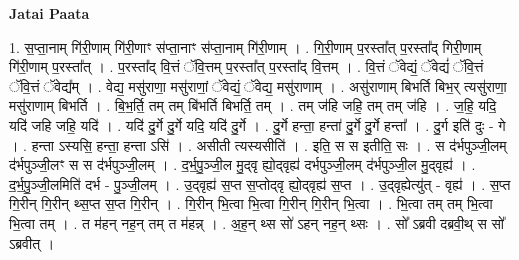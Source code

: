 \documentclass[17pt]{extarticle}
\begin{document}
\textbf{Jatai Paata} \newline

1. स॒प्ता॒नाम् गि॑री॒णाम् गि॑री॒णाꣳ स॑प्ता॒नाꣳ स॑प्ता॒नाम् गि॑री॒णाम् । . गि॒री॒णाम् प॒रस्ता᳚त् प॒रस्ता᳚द् गिरी॒णाम् गि॑री॒णाम् प॒रस्ता᳚त् । . प॒रस्ता᳚द् वि॒त्तं ॅवि॒त्तम् प॒रस्ता᳚त् प॒रस्ता᳚द् वि॒त्तम् । . वि॒त्तं ॅवेद्यं॒ ॅवेद्यं॑ ॅवि॒त्तं ॅवि॒त्तं ॅवेद्य᳚म् । . वेद्य॒ मसु॑राणा॒ मसु॑राणां॒ ॅवेद्यं॒ ॅवेद्य॒ मसु॑राणाम् । . असु॑राणाम् बिभर्ति बिभ॒र् त्यसु॑राणा॒ मसु॑राणाम् बिभर्ति । . बि॒भ॒र्ति॒ तम् तम् बि॑भर्ति बिभर्ति॒ तम् । . तम् ज॑हि जहि॒ तम् तम् ज॑हि । . ज॒हि॒ यदि॒ यदि॑ जहि जहि॒ यदि॑ । . यदि॑ दु॒र्गे दु॒र्गे यदि॒ यदि॑ दु॒र्गे । . दु॒र्गे हन्ता॒ हन्ता॑ दु॒र्गे दु॒र्गे हन्ता᳚ । . दु॒र्ग इति॑ दुः - गे । . हन्ता ऽस्यसि॒ हन्ता॒ हन्ता ऽसि॑ । . असीती त्यस्यसीति॑ । . इति॒ स स इतीति॒ सः । . स द॑र्भपुञ्जी॒लम् द॑र्भपुञ्जी॒लꣳ स स द॑र्भपुञ्जी॒लम् । . द॒र्भ॒पु॒ञ्जी॒ल मु॒द्‍वृ ह्यो॒द्‍वृह्य॑ दर्भपुञ्जी॒लम् द॑र्भपुञ्जी॒ल मु॒द्‌वृह्य॑ । . द॒र्भ॒पु॒ञ्जी॒लमिति॑ दर्भ - पु॒ञ्जी॒लम् । . उ॒द्‌वृह्य॑ स॒प्त स॒प्तोद्‌वृ ह्यो॒द्‌वृह्य॑ स॒प्त । . उ॒द्‌वृह्येत्यु॑त् - वृह्य॑ । . स॒प्त गि॒रीन् गि॒रीन् थ्स॒प्त स॒प्त गि॒रीन् । . गि॒रीन् भि॒त्वा भि॒त्वा गि॒रीन् गि॒रीन् भि॒त्वा । . भि॒त्वा तम् तम् भि॒त्वा भि॒त्वा तम् । . त म॑हन् नह॒न् तम् त म॑हन्न् । . अ॒ह॒न् थ्स सो॑ ऽहन् नह॒न् थ्सः । . सो᳚ ऽब्रवी दब्रवी॒थ् स सो᳚ ऽब्रवीत् । \newline
\end{document}

